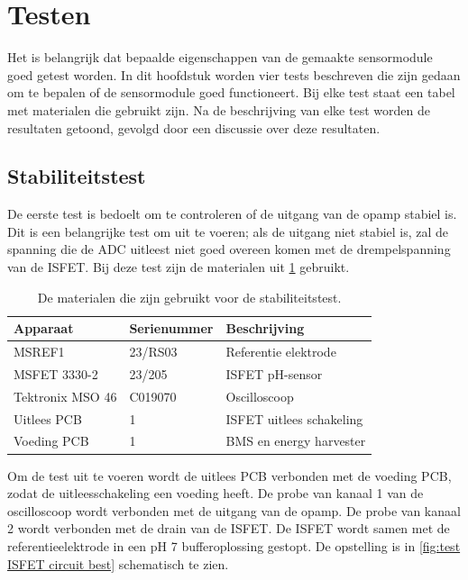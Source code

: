 \section{Testen}\label{sec:test}

Het is belangrijk dat bepaalde eigenschappen van de gemaakte sensormodule goed getest worden. In dit hoofdstuk worden vier tests beschreven die zijn gedaan om te bepalen of de sensormodule goed functioneert. Bij elke test staat een tabel met materialen die gebruikt zijn. Na de beschrijving van elke test worden de resultaten getoond, gevolgd door een discussie over deze resultaten.


\subsection{Stabiliteitstest}\label{sec:stabiliteitstest}
De eerste test is bedoelt om te controleren of de uitgang van de opamp stabiel is. Dit is een belangrijke test om uit te voeren; als de uitgang niet stabiel is, zal de spanning die de ADC uitleest niet goed overeen komen met de drempelspanning van de ISFET.
Bij deze test zijn de materialen uit \cref{tab:testMaterialen1} gebruikt.
\begin{table}[!htb]
    \centering
    \begin{tabular}{l|l|l}
        Apparaat         & Serienummer & Beschrijving \\
        \hline
        MSREF1           & 23/RS03     & Referentie elektrode       \\
        MSFET 3330-2     & 23/205      & ISFET pH-sensor            \\
        Tektronix MSO 46 & C019070     & Oscilloscoop               \\
        Uitlees PCB      & 1           & ISFET uitlees schakeling   \\
        Voeding PCB      & 1           & BMS en energy harvester    \\
        \hline
    \end{tabular}
    \caption{De materialen die zijn gebruikt voor de stabiliteitstest.}
    \label{tab:testMaterialen1}
\end{table}

Om de test uit te voeren wordt de uitlees PCB verbonden met de voeding PCB, zodat de uitleesschakeling een voeding heeft. De probe van kanaal 1 van de oscilloscoop wordt verbonden met de uitgang van de opamp. De probe van kanaal 2 wordt verbonden met de drain van de ISFET. De ISFET wordt samen met de referentieelektrode in een pH 7 bufferoplossing gestopt. De opstelling is in \cref{fig:test ISFET circuit best} schematisch te zien.

